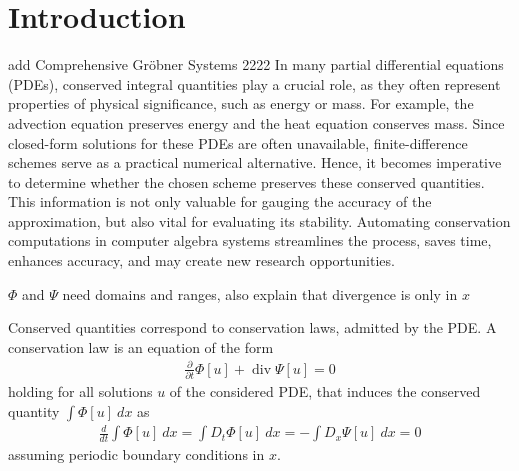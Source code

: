\documentclass[runningheads]{llncs}
\renewcommand{\div}{\operatorname{div}}
\newcommand{\1}{\chi}
\begin{document}
\section{Introduction}
{\color{blue} add 
Comprehensive Gr{\"o}bner Systems 2222
}
In many partial differential equations (PDEs), conserved integral quantities play a crucial role, as they often represent properties of physical significance, such as energy or mass. For example, the advection equation preserves energy and the heat equation conserves mass. 
Since closed-form solutions for these PDEs are often unavailable, finite-difference schemes serve as a practical numerical alternative. Hence, it becomes imperative to determine whether the chosen scheme preserves these conserved quantities. This information is not only valuable for gauging the accuracy of the approximation, but also vital for evaluating its stability. Automating conservation computations in computer algebra systems streamlines the process, saves time, enhances accuracy, and may create new research opportunities.

{\color{red} $\Phi$ and $\Psi$ need domains and ranges, also explain that divergence is only in $x$}

Conserved quantities correspond to conservation laws, admitted by the PDE. A conservation law \cite{cheviakov20} is an equation of the form
\begin{gather*}
	\frac{\partial }{\partial t}\Phi[u]+\div \Psi[u]=0
\end{gather*}
holding for all solutions $u$ of the considered PDE,
that induces the conserved quantity $\int \Phi[u]\ dx$ as
\begin{gather*}
	\frac{d}{dt}\int \Phi[u]\ dx=\int D_t\Phi[u]\ dx=-\int D_x\Psi[u]\ dx=0
\end{gather*}
assuming periodic boundary conditions in $x$.
\end{document}
